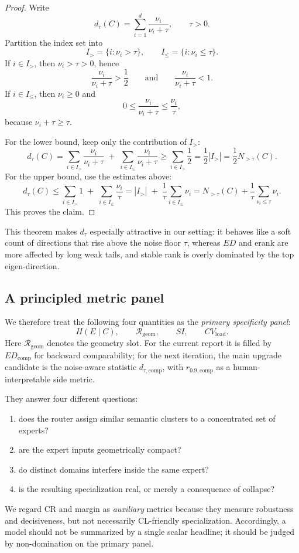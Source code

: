 \documentclass[11pt]{article}
\begin{document}
\begin{proof}
Write
\[
d_\tau(C)=\sum_{i=1}^d \frac{\nu_i}{\nu_i+\tau},
\qquad \tau>0.
\]
Partition the index set into
\[
I_> = \{i:\nu_i>\tau\},
\qquad
I_{\le} = \{i:\nu_i\le\tau\}.
\]
If $i\in I_>$, then $\nu_i>\tau>0$, hence
\[
\frac{\nu_i}{\nu_i+\tau}>\frac{1}{2}
\qquad\text{and}\qquad
\frac{\nu_i}{\nu_i+\tau}<1.
\]
If $i\in I_{\le}$, then $\nu_i\ge 0$ and
\[
0\le \frac{\nu_i}{\nu_i+\tau}\le \frac{\nu_i}{\tau},
\]
because $\nu_i+\tau\ge\tau$.

For the lower bound, keep only the contribution of $I_>$:
\[
d_\tau(C)
=
\sum_{i\in I_>} \frac{\nu_i}{\nu_i+\tau}
\;+\;
\sum_{i\in I_{\le}} \frac{\nu_i}{\nu_i+\tau}
\ge
\sum_{i\in I_>} \frac{1}{2}
=
\frac{1}{2}|I_>|
=
\frac{1}{2}N_{>\tau}(C).
\]
For the upper bound, use the estimates above:
\[
d_\tau(C)
\le
\sum_{i\in I_>} 1
\;+\;
\sum_{i\in I_{\le}} \frac{\nu_i}{\tau}
=
|I_>|
\;+\;
\frac{1}{\tau}\sum_{i\in I_{\le}}\nu_i
=
N_{>\tau}(C)+\frac{1}{\tau}\sum_{\nu_i\le\tau}\nu_i.
\]
This proves the claim.
\end{proof}

This theorem makes $d_\tau$ especially attractive in our setting: it behaves like a soft count of directions that rise above the noise floor $\tau$, whereas $ED$ and $\mathrm{erank}$ are more affected by long weak tails, and stable rank is overly dominated by the top eigen-direction.

\subsection{A principled metric panel}
We therefore treat the following four quantities as the \emph{primary specificity panel}:
\[
H(E\mid C),\qquad
\mathcal{R}_{\mathrm{geom}},\qquad
SI,\qquad
CV_{\mathrm{load}}.
\]
Here $\mathcal{R}_{\mathrm{geom}}$ denotes the geometry slot. For the current report it is filled by $ED_{\mathrm{comp}}$ for backward comparability; for the next iteration, the main upgrade candidate is the noise-aware statistic $d_{\tau,\mathrm{comp}}$, with $r_{0.9,\mathrm{comp}}$ as a human-interpretable side metric.

They answer four different questions:
\begin{enumerate}
    \item does the router assign similar semantic clusters to a concentrated set of experts?
    \item are the expert inputs geometrically compact?
    \item do distinct domains interfere inside the same expert?
    \item is the resulting specialization real, or merely a consequence of collapse?
\end{enumerate}
We regard CR and margin as \emph{auxiliary} metrics because they measure robustness and decisiveness, but not necessarily CL-friendly specialization. Accordingly, a model should not be summarized by a single scalar headline; it should be judged by non-domination on the primary panel.
\end{document}
